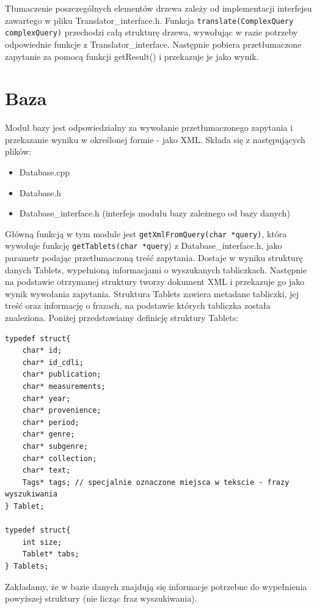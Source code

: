 Tłumaczenie poszczególnych elementów drzewa zależy od implementacji interfejsu zawartego w pliku Translator\_interface.h. 
Funkcja \verb|translate(ComplexQuery complexQuery)| przechodzi całą strukturę drzewa, wywołując w razie 
potrzeby odpowiednie funkcje z Translator\_interface.
Następnie pobiera przetłumaczone zapytanie za pomocą funkcji getResult() i przekazuje je jako wynik.

\section{Baza}
Moduł bazy jest odpowiedzialny za wywołanie przetłumaczonego zapytania i przekazanie wyniku w określonej formie - jako XML.
Składa się z następujących plików:
\begin {itemize}
 \item Database.cpp
 \item Database.h
 \item Database\_interface.h (interfejs modułu bazy zależnego od bazy danych)
\end {itemize}

Główną funkcją w tym module jest \verb|getXmlFromQuery(char *query)|, która
wywołuje funkcję \verb|getTablets(char *query|) z Database\_interface.h, jako parametr podając przetłumaczoną treść zapytania. 
Dostaje w wyniku strukturę danych Tablets, wypełnioną informacjami o wyszukanych tabliczkach.
Następnie na podstawie otrzymanej struktury tworzy dokument XML i przekazuje go jako wynik wywołania zapytania.
\newline
Struktura Tablets zawiera metadane tabliczki, jej treść oraz informację o frazach, na podstawie których tabliczka została znaleziona. 
Poniżej przedstawiamy definicję struktury Tablets:
\begin{verbatim}
typedef struct{    
    char* id;
    char* id_cdli;
    char* publication;
    char* measurements;
    char* year;
    char* provenience;
    char* period;
    char* genre;
    char* subgenre;
    char* collection;
    char* text;
    Tags* tags; // specjalnie oznaczone miejsca w tekscie - frazy wyszukiwania
} Tablet;

typedef struct{
    int size;
    Tablet* tabs;
} Tablets;
\end{verbatim}

Zakładamy, że w bazie danych znajdują się informacje potrzebne do wypełnienia powyższej struktury (nie licząc fraz wyszukiwania).

